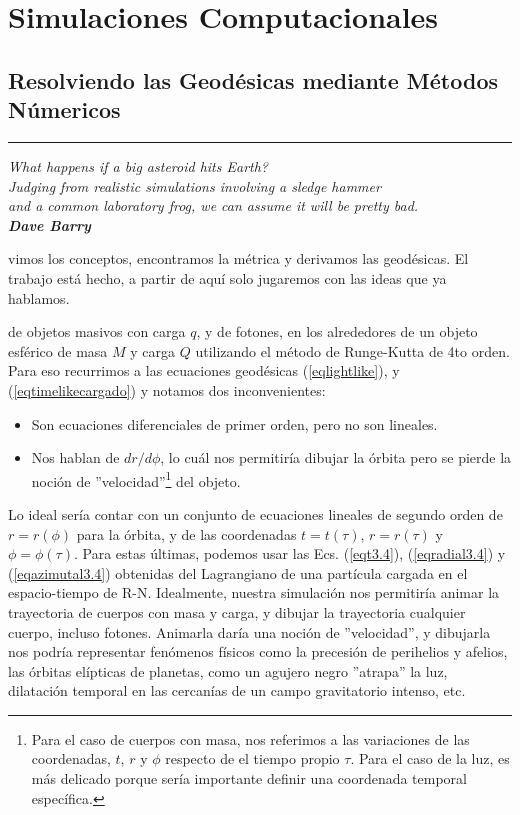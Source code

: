 \chapter{\textcolor{myred}{Simulaciones Computacionales}}

\section{\huge{Resolviendo las Geodésicas mediante Métodos Númericos}}

\textcolor{myred}{\hrule}
\begin{flushright}
\textit{What happens if a big asteroid hits Earth?\\Judging from realistic simulations involving a sledge hammer\\and a common laboratory frog, we can assume it will be pretty bad.\\\textbf{Dave Barry}}
\end{flushright}
 
 vimos los conceptos, encontramos la métrica y derivamos las geodésicas. El trabajo está hecho, a partir de aquí solo jugaremos con las ideas que ya hablamos.



 de objetos masivos con carga $q$, y de fotones, en los alrededores de un objeto esférico de masa $M$ y carga $Q$ utilizando el método de Runge-Kutta de 4to orden. Para eso recurrimos a las ecuaciones geodésicas (\ref{eqlightlike}), y (\ref{eqtimelikecargado}) y notamos dos inconvenientes:

\begin{itemize}
    \item Son ecuaciones diferenciales de primer orden, pero no son lineales.
    \item Nos hablan de $dr/d\phi$, lo cuál nos permitiría dibujar la órbita pero se pierde la noción de ''velocidad''\footnote{Para el caso de cuerpos con masa, nos referimos a las variaciones de las coordenadas, $t$, $r$ y $\phi$ respecto de el tiempo propio $\tau$. Para el caso de la luz, es más delicado porque sería importante definir una coordenada temporal específica.} del objeto.
\end{itemize}

Lo ideal sería contar con un conjunto de ecuaciones lineales de segundo orden de $r=r(\phi)$ para la órbita, y de las coordenadas $t=t(\tau)$, $r=r(\tau)$ y $\phi=\phi(\tau)$. Para estas últimas, podemos usar las Ecs. (\ref{eqt3.4}), (\ref{eqradial3.4}) y (\ref{eqazimutal3.4}) obtenidas del Lagrangiano de una partícula cargada en el espacio-tiempo de R-N. Idealmente, nuestra simulación nos permitiría animar la trayectoria de cuerpos con masa y carga, y dibujar la trayectoria cualquier cuerpo, incluso fotones. Animarla daría una noción de ''velocidad'', y dibujarla nos podría representar fenómenos físicos como la precesión de perihelios y afelios, las órbitas elípticas de planetas, como un agujero negro ''atrapa'' la luz, dilatación temporal en las cercanías de un campo gravitatorio intenso, etc.

